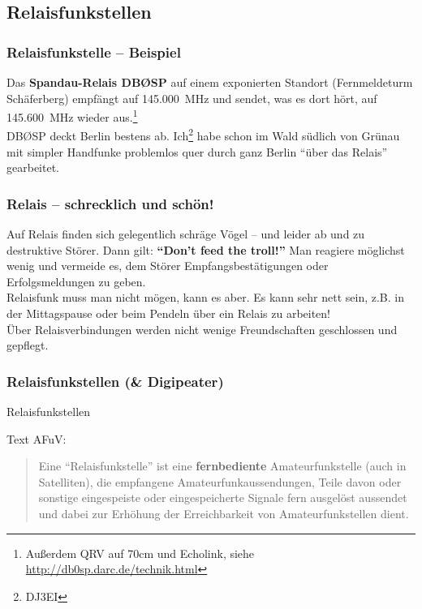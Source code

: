 \subsection{Relaisfunkstellen}

\begin{frame}
   \frametitle{Relaisfunkstelle -- Beispiel}

   Das \textbf{Spandau-Relais DBØSP} auf einem exponierten Standort
   (Fernmeldeturm Schäferberg) empfängt auf 145.000~MHz und sendet,
   was es dort hört, auf 145.600~MHz wieder aus.\footnote{Außerdem QRV auf
   70cm und Echolink, siehe \url{http://db0sp.darc.de/technik.html}}\\[1.5em]

   DBØSP deckt Berlin bestens ab.  Ich\footnote{DJ3EI} habe schon im
   Wald südlich von Grünau mit simpler Handfunke problemlos quer durch
   ganz Berlin ``über das Relais'' gearbeitet.
\end{frame}

\begin{frame}
   \frametitle{Relais -- schrecklich und schön!}

   Auf Relais finden sich gelegentlich schräge Vögel -- und leider ab
   und zu destruktive Störer.  Dann gilt: \textbf{``Don't feed the
   troll!''} Man reagiere möglichst wenig und vermeide es, dem Störer
   Empfangsbestätigungen oder Erfolgsmeldungen zu geben.\\[1em]

   Relaisfunk muss man nicht mögen, kann es aber. Es kann sehr nett
   sein, z.B. in der Mittagspause oder beim Pendeln über ein Relais zu
   arbeiten!\\[1em]

   Über Relaisverbindungen werden nicht wenige Freundschaften
   geschlossen und gepflegt.

\end{frame}


\begin{frame}
  \frametitle{Relaisfunkstellen (\& Digipeater)}

  \begin{center}
    \Large Relaisfunkstellen
  \end{center}

  Text AFuV: \\[1em]

  \begin{quote}
    Eine ``Relaisfunkstelle'' ist eine \textbf{fernbediente} Amateurfunkstelle
    (auch in Satelliten), die empfangene Amateurfunkaussendungen, Teile davon
    oder sonstige eingespeiste oder eingespeicherte Signale fern ausgelöst
    aussendet und dabei zur Erhöhung der Erreichbarkeit von Amateurfunkstellen
    dient.
  \end{quote}


\end{frame}


